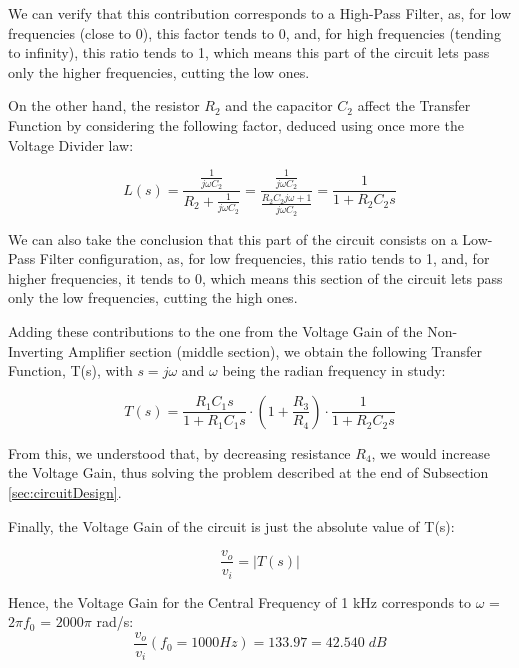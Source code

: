 We can verify that this contribution corresponds to a High-Pass Filter, as, for low frequencies (close to 0), this factor tends to 0, and, for high frequencies (tending to infinity), this ratio tends to 1, which means this part of the circuit lets pass only the higher frequencies, cutting the low ones.

On the other hand, the resistor $R_2$ and the capacitor $C_2$ affect the Transfer Function by considering the following factor, deduced using once more the Voltage Divider law:

\begin{equation}
	L(s)=\frac{\frac{1}{j\omega C_2}}{R_2+\frac{1}{j \omega C_2}}= \frac{\frac{1}{j\omega C_2}}{\frac{R_2 C_2j\omega + 1}{j\omega C_2}} = \frac{1}{1 + R_2 C_2 s} 
	\label{eq:ls}
\end{equation}

We can also take the conclusion that this part of the circuit consists on a Low-Pass Filter configuration, as, for low frequencies, this ratio tends to 1, and, for higher frequencies, it tends to 0, which means this section of the circuit lets pass only the low frequencies, cutting the high ones.  

Adding these contributions to the one from the Voltage Gain of the Non-Inverting Amplifier section (middle section), we obtain the following Transfer Function, T(s), with $s = j\omega$ and $\omega$ being the radian frequency in study: 

\begin{equation}
	T(s) = \frac{R_1 C_1 s}{1 + R_1 C_1 s} \cdot \left(1 + \frac{R_3}{R_4}\right) \cdot \frac{1}{1 + R_2 C_2 s}
	\label{eq:transferFunction}
\end{equation}

From this, we understood that, by decreasing resistance $R_4$, we would increase the Voltage Gain, thus solving the problem described at the end of Subsection \ref{sec:circuitDesign}.

Finally, the Voltage Gain of the circuit is just the absolute value of T(s):

\begin{equation}
	\frac{v_o}{v_i} = |T(s)|
	\label{eq:gainTotal}
\end{equation}

Hence, the Voltage Gain for the Central Frequency of 1 kHz corresponds to $\omega$ = $2\pi f_0$ = $2000\pi$ rad/s:
\begin{equation}
	\frac{v_o}{v_i}(f_0 = 1000 Hz) = 133.97 = 42.540\;dB
	\label{eq:gainTotalVal}
\end{equation}

